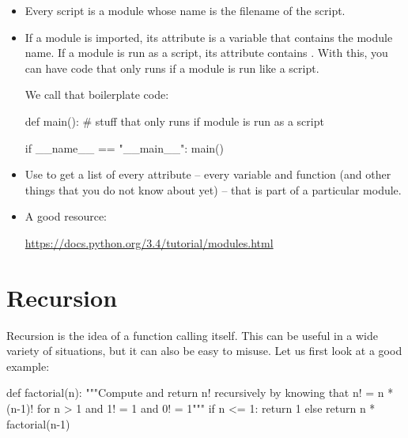 \documentclass[11pt]{cselabheader}
\begin{document}
{\begin{itemize}
    Attributes can be functions defined in the module or variables defined in
    the module. A special attribute is , which contains
    the name of the module unless the module is executed as a script.

  \item Every script is a module whose name is the filename of the script.

  \item If a module is imported, its  attribute is a
    variable that contains the module name. If a module is run as a script, its
     attribute contains . With
    this, you can have code that only runs if a module is run like a script.

    We call that boilerplate code:

    \begin{python3code}
def main():
    # stuff that only runs if module is run as a script

if __name__ == "__main__":
    main()
    \end{python3code}

  \item Use  to get a list of every attribute -- every
    variable and function (and other things that you do not know about yet) --
    that is part of a particular module.

  \item A good resource:

    \begin{center}
      \url{https://docs.python.org/3.4/tutorial/modules.html}
    \end{center}

\end{itemize}


\pagebreak
\section{Recursion}
\label{sec:rec}

Recursion is the idea of a function calling itself. This can be useful in a wide
variety of situations, but it can also be easy to misuse. Let us first look at a
good example:
\begin{python3code}
def factorial(n):
    """Compute and return n! recursively by knowing that n! = n * (n-1)! for n > 1
    and 1! = 1 and 0! = 1"""
    if n <= 1:
        return 1
    else
        return n * factorial(n-1)
\end{python3code}

}
\end{document}
